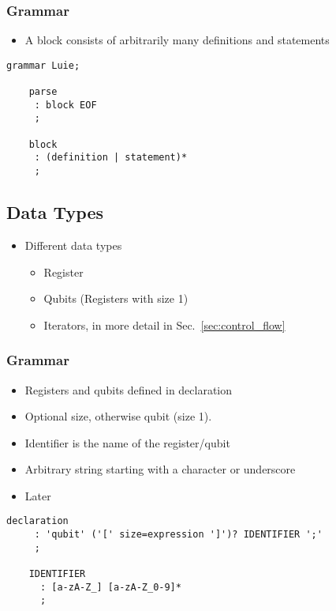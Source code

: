 \subsubsection{Grammar}
\begin{itemize}
    \item A block consists of arbitrarily many definitions and statements
\end{itemize}

\begin{lstlisting}[style=ANTLR]
    grammar Luie;
    
    parse
     : block EOF
     ;
    
    block
     : (definition | statement)*
     ;
\end{lstlisting}

\subsection{Data Types}
\begin{itemize}
    \item Different data types
    \begin{itemize}
        \item Register
        \item Qubits (Registers with size 1)
        \item Iterators, in more detail in Sec.~\ref{sec:control_flow}
    \end{itemize}

\end{itemize}

\subsubsection{Grammar}
\begin{itemize}
    \item Registers and qubits defined in declaration
    \item Optional size, otherwise qubit (size 1).
    \item Identifier is the name of the register/qubit
    \item Arbitrary string starting with a character or underscore
    \item Later 
\end{itemize}
\begin{lstlisting}[style=ANTLR]
    declaration
     : 'qubit' ('[' size=expression ']')? IDENTIFIER ';'
     ;

    IDENTIFIER 
      : [a-zA-Z_] [a-zA-Z_0-9]*
      ;
\end{lstlisting}
